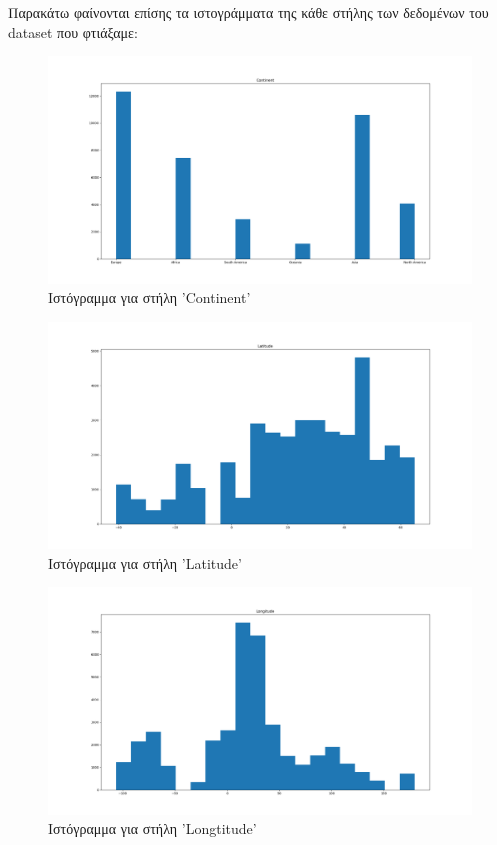 \documentclass[12pt,a4paper]{article}
\begin{document}
Παρακάτω φαίνονται επίσης τα ιστογράμματα της κάθε στήλης των δεδομένων του dataset που φτιάξαμε:

\begin{figure}[H]
	\includegraphics[width=\textwidth]{Figures/Question1/1. Histogram for Continent.png}
	\caption{Ιστόγραμμα για στήλη 'Continent'}
\end{figure}

\begin{figure}[H]
	\includegraphics[width=\textwidth]{Figures/Question1/2. Histogram for Latitude.png}
	\caption{Ιστόγραμμα για στήλη 'Latitude'}
\end{figure}

\begin{figure}[H]
	\includegraphics[width=\textwidth]{Figures/Question1/3. Histogram for Longtitude.png}
	\caption{Ιστόγραμμα για στήλη 'Longtitude'}
\end{figure}
\end{document}
